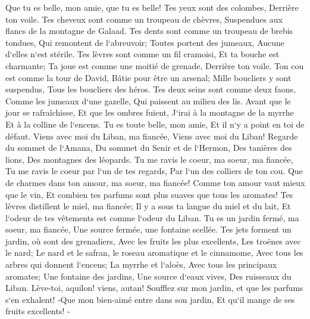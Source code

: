\verse Que tu es belle, mon amie, que tu es belle! Tes yeux sont des colombes, Derrière ton voile. Tes cheveux sont comme un troupeau de chèvres, Suspendues aux flancs de la montagne de Galaad. 
\verse Tes dents sont comme un troupeau de brebis tondues, Qui remontent de l`abreuvoir; Toutes portent des jumeaux, Aucune d`elles n`est stérile. 
\verse Tes lèvres sont comme un fil cramoisi, Et ta bouche est charmante; Ta joue est comme une moitié de grenade, Derrière ton voile. 
\verse Ton cou est comme la tour de David, Bâtie pour être un arsenal; Mille boucliers y sont suspendus, Tous les boucliers des héros. 
\verse Tes deux seins sont comme deux faons, Comme les jumeaux d`une gazelle, Qui paissent au milieu des lis. 
\verse Avant que le jour se rafraîchisse, Et que les ombres fuient, J`irai à la montagne de la myrrhe Et à la colline de l`encens. 
\verse Tu es toute belle, mon amie, Et il n`y a point en toi de défaut. 
\verse Viens avec moi du Liban, ma fiancée, Viens avec moi du Liban! Regarde du sommet de l`Amana, Du sommet du Senir et de l`Hermon, Des tanières des lions, Des montagnes des léopards. 
\verse Tu me ravis le coeur, ma soeur, ma fiancée, Tu me ravis le coeur par l`un de tes regards, Par l`un des colliers de ton cou. 
\verse Que de charmes dans ton amour, ma soeur, ma fiancée! Comme ton amour vaut mieux que le vin, Et combien tes parfums sont plus suaves que tous les aromates! 
\verse Tes lèvres distillent le miel, ma fiancée; Il y a sous ta langue du miel et du lait, Et l`odeur de tes vêtements est comme l`odeur du Liban. 
\verse Tu es un jardin fermé, ma soeur, ma fiancée, Une source fermée, une fontaine scellée. 
\verse Tes jets forment un jardin, où sont des grenadiers, Avec les fruits les plus excellents, Les troënes avec le nard; 
\verse Le nard et le safran, le roseau aromatique et le cinnamome, Avec tous les arbres qui donnent l`encens; La myrrhe et l`aloès, Avec tous les principaux aromates; 
\verse Une fontaine des jardins, Une source d`eaux vives, Des ruisseaux du Liban. 
\verse Lève-toi, aquilon! viens, autan! Soufflez sur mon jardin, et que les parfums s`en exhalent! -Que mon bien-aimé entre dans son jardin, Et qu`il mange de ses fruits excellents! - 

\chapter{}

